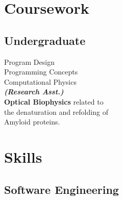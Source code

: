 \documentclass[letterpaper]{deedy-resume} %
\begin{document}
\begin{minipage}[t]{0.33\textwidth}
\sectionspace %






\section{Coursework}

\subsection{Undergraduate}

Program Design \\
Programming Concepts \\
Computational Physics \\

{\footnotesize \textit{\textbf{(Research Asst.) }}} \\
{\bf Optical Biophysics} related to \\
the denaturation and refolding of \\ 
Amyloid proteins. \\


\sectionspace %


\section{Skills}

\subsection{Software Engineering}


\end{minipage}
\end{document}
